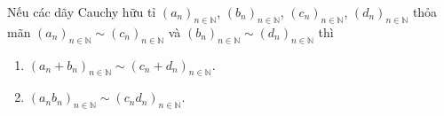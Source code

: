 \begin{theorem}\label{theorem:basis-of-equivalence-class-of-rational-cauchy-sequences-addition}
    Nếu các dãy Cauchy hữu tỉ ${(a_{n})}_{n\in\mathbb{N}}$, ${(b_{n})}_{n\in\mathbb{N}}$, ${(c_{n})}_{n\in\mathbb{N}}$, ${(d_{n})}_{n\in\mathbb{N}}$ thỏa mãn ${(a_{n})}_{n\in\mathbb{N}}\sim {(c_{n})}_{n\in\mathbb{N}}$ và ${(b_{n})}_{n\in\mathbb{N}}\sim {(d_{n})}_{n\in\mathbb{N}}$ thì
    \begin{enumerate}[label={(\roman*)}]
        \item ${(a_{n} + b_{n})}_{n\in\mathbb{N}} \sim {(c_{n} + d_{n})}_{n\in\mathbb{N}}$.
        \item ${(a_{n}b_{n})}_{n\in\mathbb{N}} \sim {(c_{n}d_{n})}_{n\in\mathbb{N}}$.
    \end{enumerate}
\end{theorem}

